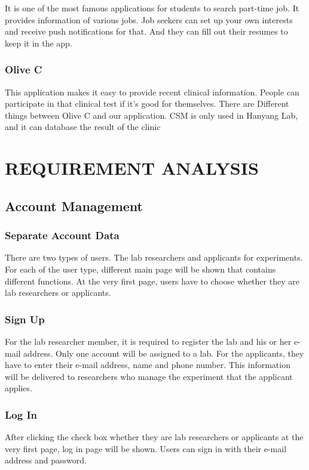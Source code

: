 \documentclass[letterpaper, 10 pt, conference]{ieeeconf}  %
\begin{document}
It is one of the most famous applications for students to search part-time job. It provides information of various jobs. Job seekers can set up your own interests and receive push notifications for that. And they can fill out their resumes to keep it in the app.

\subsubsection{Olive C}
This application makes it easy to provide recent clinical information. People can participate in that clinical test if it’s good for themselves. There are Different things between Olive C and our application. CSM  is only used in Hanyang Lab, and it can database the result of the clinic




\section{REQUIREMENT ANALYSIS\\}


\subsection{Account Management}
\subsubsection{Separate Account Data}
There are two types of users. The lab researchers and applicants for experiments. For each of the user type, different main page will be shown that contains different functions. At the very first page, users have to choose whether they are lab researchers or applicants. 
\subsubsection{Sign Up}
For the lab researcher member, it is required to register the lab and his or her e-mail address. Only one account will be assigned to a lab. For the applicants, they have to enter their e-mail address, name and phone number. This information will be delivered to researchers who manage the experiment that the applicant applies. 
\subsubsection{Log In}
After clicking the check box whether they are lab researchers or applicants at the very first page, log in page will be shown. Users can sign in with their e-mail address and password. 
\end{document}
